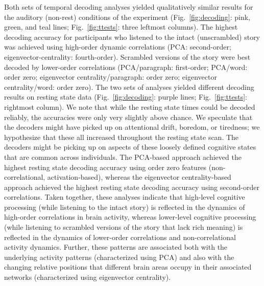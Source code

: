 \documentclass[english]{article}
\begin{document}
Both sets of temporal decoding analyses yielded qualitatively similar
results for the auditory (non-rest) conditions of the experiment
(Fig.~\ref{fig:decoding}: pink, green, and teal lines;
Fig.~\ref{fig:ttests}: three leftmost columns).  The highest
decoding accuracy for participants who listened to the intact
(unscrambled) story was achieved using high-order dynamic correlations
(PCA: second-order; eigenvector-centrality: fourth-order).  Scrambled
versions of the story were best decoded by lower-order correlations
(PCA/paragraph: first-order; PCA/word: order zero; eigenvector
centrality/paragraph: order zero; eigenvector centrality/word: order
zero).  The two sets of analyses yielded different decoding results on
resting state data (Fig.~\ref{fig:decoding}: purple lines;
Fig.~\ref{fig:ttests}: rightmost column).  We note
that while the resting state times could be decoded reliably, the
accuracies were only very slightly above chance.  We speculate that
the decoders might have picked up on attentional drift, boredom, or
tiredness; we hypothesize that these all increased throughout the resting
state scan.  The decoders might be picking up on aspects of these
loosely defined cognitive states that are common across individuals.
The PCA-based approach achieved the highest resting state decoding
accuracy using order zero features (non-correlational,
activation-based), whereas the eigenvector centrality-based approach
achieved the highest resting state decoding accuracy using
second-order correlations.  Taken together, these analyses indicate
that high-level cognitive processing (while listening to the intact
story) is reflected in the dynamics of high-order correlations in
brain activity, whereas lower-level cognitive processing (while
listening to scrambled versions of the story that lack rich meaning)
is reflected in the dynamics of lower-order correlations and
non-correlational activity dynamics.  Further, these patterns are
associated both with the underlying activity patterns (characterized
using PCA) and also with the changing relative positions that
different brain areas occupy in their associated networks
(characterized using eigenvector centrality).
\end{document}
